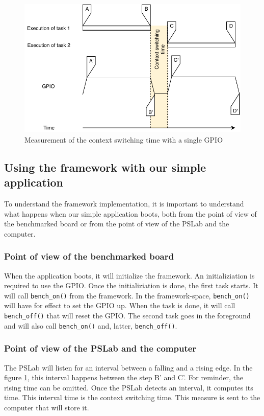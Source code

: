 \begin{figure}[!ht]
  \centering
  \includegraphics[scale=1]{assets/external-framework-context-switching-time-measurement.pdf}
  \caption{\label{fig:external-framework-context-switching-time-measurement}Measurement of the context switching time with a single GPIO}
\end{figure}

\subsection{Using the framework with our simple application}

To understand the framework implementation, it is important to understand what happens when our simple application boots, 
  both from the point of view of the benchmarked board or from the point of view of the PSLab and the computer.

\subsubsection{Point of view of the benchmarked board}
When the application boots, it will initialize the framework.
An initializiation is required to use the GPIO.
Once the initializiation is done, the first task starts.
It will call \texttt{bench\_on()} from the framework.
In the framework-space, \texttt{bench\_on()} will have for effect to set the GPIO up.
When the task is done, it will call \texttt{bench\_off()} that will reset the GPIO.
The second task goes in the foreground and will also call \texttt{bench\_on()} and, latter, \texttt{bench\_off()}.

\subsubsection{Point of view of the PSLab and the computer}
The PSLab will listen for an interval between a falling and a rising edge.
In the figure \ref{fig:external-framework-context-switching-time-measurement}, this interval happens between the step B' and C'.
For reminder, the rising time can be omitted.
Once the PSLab detects an interval, it computes its time.
This interval time is the context switching time.
This measure is sent to the computer that will store it.

